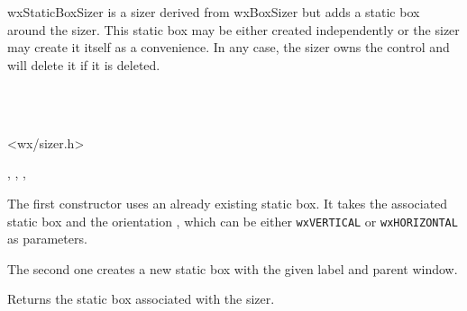 \section{}\label{wxstaticboxsizer}

wxStaticBoxSizer is a sizer derived from wxBoxSizer but adds a static
box around the sizer. This static box may be either created independently or
the sizer may create it itself as a convenience. In any case, the sizer owns
the  control and will delete it if it is
deleted.


\\
\\


<wx/sizer.h>




, , , 



\label{wxstaticboxsizerwxstaticboxsizer}



The first constructor uses an already existing static box. It takes the
associated static box and the orientation , which can be either
\texttt{wxVERTICAL} or \texttt{wxHORIZONTAL} as parameters.

The second one creates a new static box with the given label and parent window.


\label{wxstaticboxsizergetstaticbox}


Returns the static box associated with the sizer.

